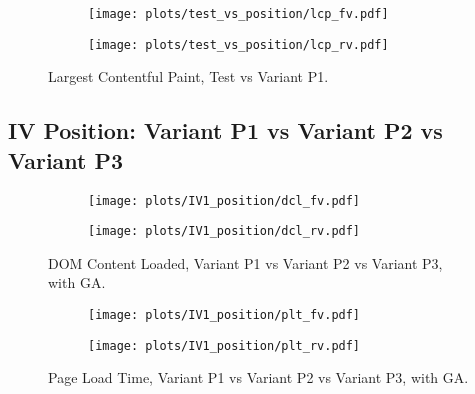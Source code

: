 \begin{figure}
	\centering
	\begin{subfigure}{.5\textwidth}
		\centering
		\texttt{[image: plots/test\_vs\_position/lcp\_fv.pdf]}
		\label{fig:sub1}
	\end{subfigure}%
	\begin{subfigure}{.5\textwidth}
		\centering
		\texttt{[image: plots/test\_vs\_position/lcp\_rv.pdf]}
		\label{fig:sub2}
	\end{subfigure}
	\caption{Largest Contentful Paint, Test vs Variant P1.}
	\label{figure:plt_original_test}
\end{figure}

\clearpage


\subsection{IV Position: Variant P1 vs Variant P2 vs Variant P3}

\begin{figure}
	\centering
	\begin{subfigure}{.5\textwidth}
		\centering
		\texttt{[image: plots/IV1\_position/dcl\_fv.pdf]}
		\label{fig:sub1}
	\end{subfigure}%
	\begin{subfigure}{.5\textwidth}
		\centering
		\texttt{[image: plots/IV1\_position/dcl\_rv.pdf]}
		\label{fig:sub2}
	\end{subfigure}
	\caption{DOM Content Loaded, Variant P1 vs Variant P2 vs Variant P3, with GA.}
	\label{figure:plt_original_test}
\end{figure}


\begin{figure}
	\centering
	\begin{subfigure}{.5\textwidth}
		\centering
		\texttt{[image: plots/IV1\_position/plt\_fv.pdf]}
		\label{fig:sub1}
	\end{subfigure}%
	\begin{subfigure}{.5\textwidth}
		\centering
		\texttt{[image: plots/IV1\_position/plt\_rv.pdf]}
		\label{fig:sub2}
	\end{subfigure}
	\caption{Page Load Time, Variant P1 vs Variant P2 vs Variant P3, with GA.}
	\label{figure:plt_original_test}
\end{figure}


